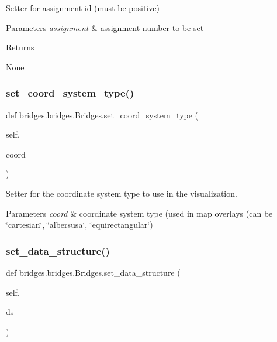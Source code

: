 Setter for assignment id (must be positive) 


\begin{DoxyParams}{Parameters}
{\em assignment} & assignment number to be set \\
\hline
\end{DoxyParams}
\begin{DoxyReturn}{Returns}


None 
\end{DoxyReturn}
\mbox{\label{classbridges_1_1bridges_1_1_bridges_a6bc905490b1995234f88f47af9aa8a17}} 
\subsubsection{\texorpdfstring{set\+\_\+coord\+\_\+system\+\_\+type()}{set\_coord\_system\_type()}}
{\footnotesize\ttfamily def bridges.\+bridges.\+Bridges.\+set\+\_\+coord\+\_\+system\+\_\+type (\begin{DoxyParamCaption}\item[{}]{self,  }\item[{}]{coord }\end{DoxyParamCaption})}



Setter for the coordinate system type to use in the visualization. 


\begin{DoxyParams}{Parameters}
{\em coord} & coordinate system type (used in map overlays (can be \char`\"{}cartesian\char`\"{}, \char`\"{}albersusa\char`\"{}, \char`\"{}equirectangular\char`\"{}) \\
\hline
\end{DoxyParams}
\mbox{\label{classbridges_1_1bridges_1_1_bridges_a868f02fa66c87c1a1fc7bd6fbc799291}} 
\subsubsection{\texorpdfstring{set\+\_\+data\+\_\+structure()}{set\_data\_structure()}}
{\footnotesize\ttfamily def bridges.\+bridges.\+Bridges.\+set\+\_\+data\+\_\+structure (\begin{DoxyParamCaption}\item[{}]{self,  }\item[{}]{ds }\end{DoxyParamCaption})}

